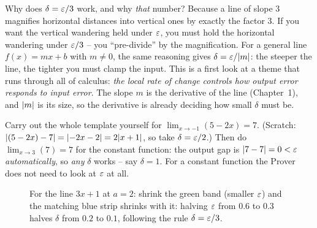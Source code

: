 \begin{whybox}
Why does $\delta = \varepsilon/3$ work, and why \emph{that} number? Because a line of
slope $3$ magnifies horizontal distances into vertical ones by exactly the factor
$3$. If you want the vertical wandering held under $\varepsilon$, you must hold the
horizontal wandering under $\varepsilon/3$ -- you ``pre-divide'' by the magnification.
For a general line $f(x)=mx+b$ with $m\ne 0$, the same reasoning gives
$\delta = \varepsilon/\lvert m\rvert$: the steeper the line, the tighter you must clamp the
input. This is a first look at a theme that runs through all of calculus:
\emph{the local rate of change controls how output error responds to input
error}. The slope $m$ is the derivative of the line (Chapter~1), and $\lvert m\rvert$ is
its size, so the derivative is already deciding how small $\delta$ must be.
\end{whybox}

\begin{labbox}
Carry out the whole template yourself for $\displaystyle\lim_{x\to -1}(5 - 2x) =
7$. (Scratch: $\lvert(5-2x)-7\rvert = \lvert-2x-2\rvert = 2\lvert x+1\rvert$, so take
$\delta = \varepsilon/2$.) Then do $\lim_{x\to 3}(7) = 7$ for the constant function:
the output gap is $\lvert7-7\rvert=0<\varepsilon$
\emph{automatically}, so \emph{any} $\delta$ works -- say $\delta = 1$. For a
constant function the Prover does not need to look at $\varepsilon$ at all.
\end{labbox}

\begin{figure}[htbp]
\centering
{}
\caption{For the line $3x+1$ at $a=2$: shrink the green band (smaller $\varepsilon$) and
the matching blue strip shrinks with it: halving $\varepsilon$ from $0.6$ to $0.3$
halves $\delta$ from $0.2$ to $0.1$, following the rule $\delta=\varepsilon/3$.}
\label{ch06:fig-linear}
\end{figure}

